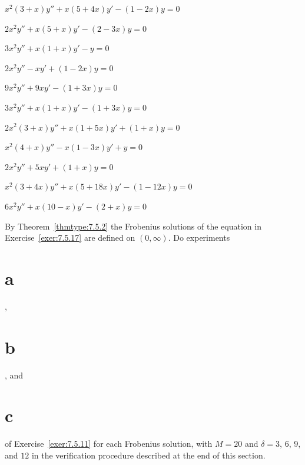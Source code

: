 \begin{exerciselist}
  \item\label{exer:7.5.15} $x^{2}(3+x)y''+x(5+4x)y'-(1-2x)y=0$

  \item\label{exer:7.5.16} $2x^{2}y''+x(5+x)y'-(2-3x)y=0$

  \item\label{exer:7.5.17} $3x^{2}y''+x(1+x)y'-y=0$

  \item\label{exer:7.5.18} $2x^{2}y''-xy'+(1-2x)y=0$

  \item\label{exer:7.5.19} $9x^{2}y''+9xy'-(1+3x)y=0$

  \item\label{exer:7.5.20} $3x^{2}y''+x(1+x)y'-(1+3x)y=0$

  \item\label{exer:7.5.21} $2x^{2}(3+x)y''+x(1+5x)y'+(1+x)y=0$

  \item\label{exer:7.5.22} $x^{2}(4+x)y''-x(1-3x)y'+y=0$

  \item\label{exer:7.5.23} $2x^{2}y''+5xy'+(1+x)y=0$

  \item\label{exer:7.5.24} $x^{2}(3+4x)y''+x(5+18x)y'-(1-12x)y=0$

  \item\label{exer:7.5.25} $6x^{2}y''+x(10-x)y'-(2+x)y=0$

  \item\label{exer:7.5.26} \Lex By Theorem~\ref{thmtype:7.5.2} the Frobenius solutions of the
        equation in Exercise~\ref{exer:7.5.17} are defined on $(0,\infty)$. Do experiments \part{a},
        \part{b}, and \part{c} of Exercise~\ref{exer:7.5.11} for each Frobenius solution, with
        $M=20$ and $\delta=3$, $6$, $9$, and $12$ in the verification procedure described at the end
        of this section.


\end{exerciselist}
